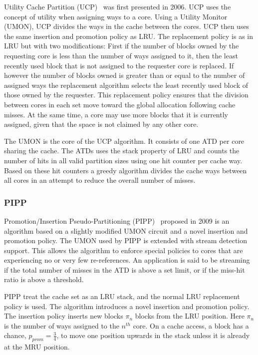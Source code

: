 Utility Cache Partition (UCP)~\cite{utilityBasedCachePartitioning} was first presented in 2006. 
UCP uses the concept of utility when assigning ways to a core.
Using a Utility Monitor (UMON), UCP divides the ways in the cache between the cores.
UCP then uses the same insertion and promotion policy as LRU.
The replacement policy is as in LRU but with two modifications:
First if the number of blocks owned by the requesting core is less than the number of ways assigned to it, then the least recently used block that is not assigned to the requester core is replaced.
If however the number of blocks owned is greater than or equal to the number of assigned ways the replacement algorithm selects the least recently used block of those owned by the requester.
This replacement policy ensures that the division between cores in each set move toward the global allocation following cache misses.
At the same time, a core may use more blocks that it is currently assigned, given that the space is not claimed by any other core.

The UMON is the core of the UCP algorithm.
It consists of one ATD per core sharing the cache. 
The ATDs uses the stack property of LRU and counts the number of hits in all valid partition sizes using one hit counter per cache way.
Based on these hit counters a greedy algorithm divides the cache ways between all cores in an attempt to reduce the overall number of misses.

\subsubsection{PIPP}

Promotion/Insertion Pseudo-Partitioning (PIPP)~\cite{xie09} proposed in 2009 is an algorithm based on a slightly modified UMON circuit and a novel insertion and promotion policy.
The UMON used by PIPP is extended with stream detection support.
This allows the algorithm to enforce special policies to cores that are experiencing no or very few re-references.
An application is said to be streaming if the total number of misses in the ATD is above a set limit, or if the miss-hit ratio is above a threshold.

PIPP treat the cache set as an LRU stack, and the normal LRU replacement policy is used.
The algorithm introduces a novel insertion and promotion policy.
The insertion policy inserts new blocks $\pi_n$ blocks from the LRU position. 
Here $\pi_n$ is the number of ways assigned to the $n^{th}$ core.
On a cache access, a block has a chance, $p_{prom} = \frac{3}{4}$, to move one position upwards in the stack unless it is already at the MRU position.

